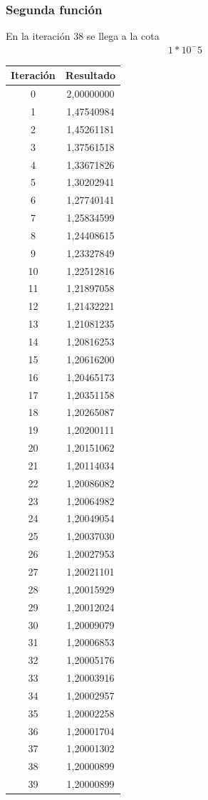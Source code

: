 \documentclass[titlepage,a4paper]{article}
\begin{document}
\subsubsection{Segunda función}\label{sec:sec2}
En la iteración 38 se llega a la cota \begin{align}1*10^-5
\end{align}
\begin{tabular}{| c | c |}
\hline
 Iteración & Resultado \\ \hline
    0     & 2,00000000 \\
    1     & 1,47540984 \\
    2     & 1,45261181 \\
    3     & 1,37561518 \\
    4     & 1,33671826 \\
    5     & 1,30202941 \\
    6     & 1,27740141 \\
    7     & 1,25834599 \\
    8     & 1,24408615 \\
    9     & 1,23327849 \\
    10    & 1,22512816 \\
    11    & 1,21897058 \\
    12    & 1,21432221 \\
    13    & 1,21081235 \\
    14    & 1,20816253 \\
    15    & 1,20616200 \\
    16    & 1,20465173 \\
    17    & 1,20351158 \\
    18    & 1,20265087 \\
    19    & 1,20200111 \\
    20    & 1,20151062 \\
    21    & 1,20114034 \\
    22    & 1,20086082 \\
    23    & 1,20064982 \\
    24    & 1,20049054 \\
    25    & 1,20037030 \\
    26    & 1,20027953 \\
    27    & 1,20021101 \\
    28    & 1,20015929 \\
    29    & 1,20012024 \\
    30    & 1,20009079 \\
    31    & 1,20006853 \\
    32    & 1,20005176 \\
    33    & 1,20003916 \\
    34    & 1,20002957 \\
    35    & 1,20002258 \\
    36    & 1,20001704 \\
    37    & 1,20001302 \\
    38    & 1,20000899 \\
    39    & 1,20000899 \\
\hline
\end{tabular}
\end{document}

